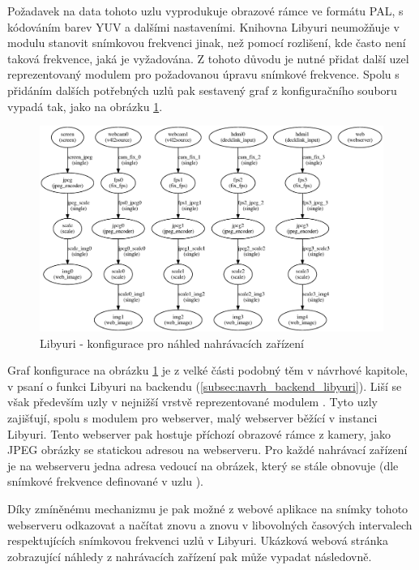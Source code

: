 \documentclass[thesis=M,czech]{FITthesis}[2012/06/26]
\begin{document}
Požadavek na data tohoto uzlu vyprodukuje obrazové rámce ve formátu PAL, s kódováním barev YUV a dalšími nastaveními. Knihovna Libyuri neumožňuje v modulu  stanovit snímkovou frekvenci jinak, než pomocí rozlišení, kde často není taková frekvence, jaká je vyžadována. Z tohoto důvodu je nutné přidat další uzel reprezentovaný modulem  pro požadovanou úpravu snímkové frekvence. Spolu s přidáním dalších potřebných uzlů pak sestavený graf z konfiguračního souboru vypadá tak, jako na obrázku \ref{img:impl_funkce_preview_conf}.
\\
\begin{figure}[h]\centering
	\includegraphics[width=1\textwidth]{images/ulab_cam_preview.eps}
	\caption{Libyuri - konfigurace pro náhled nahrávacích zařízení}\label{img:impl_funkce_preview_conf}
\end{figure}

Graf konfigurace na obrázku \ref{img:impl_funkce_preview_conf} je z velké části podobný těm v návrhové kapitole, v psaní o funkci Libyuri na backendu (\ref{subsec:navrh_backend_libyuri}). Liší se však především uzly v nejnižší vrstvě reprezentované modulem . Tyto uzly zajišťují, spolu s modulem pro webserver, malý webserver běžící v instanci Libyuri. Tento webserver pak hostuje příchozí obrazové rámce z kamery, jako JPEG obrázky se statickou adresou na webserveru. Pro každé nahrávací zařízení je na webserveru jedna adresa vedoucí na obrázek, který se stále obnovuje (dle snímkové frekvence definované v uzlu ).

Díky zmíněnému mechanizmu je pak možné z webové aplikace na snímky tohoto webserveru odkazovat a načítat znovu a znovu v libovolných časových intervalech respektujících snímkovou frekvenci uzlů v Libyuri. Ukázková webová stránka zobrazující náhledy z nahrávacích zařízení pak může vypadat následovně.\\
\end{document}
